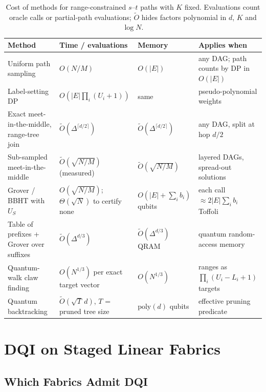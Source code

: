 \documentclass[journal]{IEEEtran}
\begin{document}
\begin{table}[t]
\caption{Cost of methods for range-constrained $s$--$t$ paths with $K$ fixed. Evaluations count oracle calls or partial-path evaluations; $\tilde O$ hides factors polynomial in $d$, $K$ and $\log N$.}
\label{tab:complexity}
\centering
\footnotesize
\setlength{\tabcolsep}{4pt}
\begin{tabular}{llll}
\hline \hline
\textbf{Method} & \textbf{Time / evaluations} & \textbf{Memory} & \textbf{Applies when} \\
\hline
Uniform path sampling & $O(N/M)$ & $O(|E|)$ & any DAG; path counts by DP in $O(|E|)$ \\
Label-setting DP & $O(|E|\prod_{i}(U_{i}+1))$ & same & pseudo-polynomial weights \\
Exact meet-in-the-middle, range-tree join & $\tilde O(\Delta^{\lceil d/2\rceil})$ & $\tilde O(\Delta^{\lceil d/2\rceil})$ & any DAG, split at hop $d/2$ \\
Sub-sampled meet-in-the-middle & $\tilde O(\sqrt{N/M})$ (measured) & $\tilde O(\sqrt{N/M})$ & layered DAGs, spread-out solutions \\
Grover / BBHT with $U_{S}$ & $O(\sqrt{N/M})$; $\Theta(\sqrt N)$ to certify none & $O(|E|+\sum_{i}b_{i})$ qubits & each call $\approx 2|E|\sum_{i}b_{i}$ Toffoli \\
Table of prefixes + Grover over suffixes & $\tilde O(\Delta^{d/3})$ & $\tilde O(\Delta^{d/3})$ QRAM & quantum random-access memory \\
Quantum-walk claw finding & $O(N^{1/3})$ per exact target vector & $O(N^{1/3})$ & ranges as $\prod_{i}(U_{i}-L_{i}+1)$ targets \\
Quantum backtracking~\cite{montanaro2018} & $\tilde O(\sqrt{T}\,d)$, $T$ = pruned tree size & $\mathrm{poly}(d)$ qubits & effective pruning predicate \\
\hline \hline
\end{tabular}
\end{table}

\section{DQI on Staged Linear Fabrics}
\label{sec:dqi}

\subsection{Which Fabrics Admit DQI}
\end{document}
